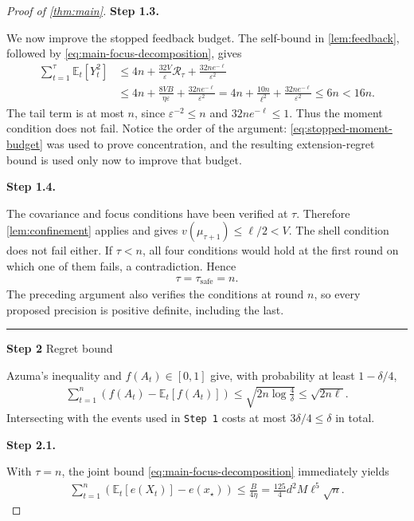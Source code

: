 \documentclass[11pt]{article}
\newcommand{\proofstep}[2]{%
    \par\medskip
    \noindent
    \textcolor{blue!55!black}{\rule{2pt}{1.2em}}%
    \hspace{0.6em}%
    {\sffamily\bfseries\color{blue!55!black}Step #1}%
    \quad
    {\sffamily #2}%
    \par\smallskip
}
\newcommand{\proofstepinline}[1]{%
    {\sffamily\bfseries\color{blue!55!black}Step #1.}\enspace
}
\newcommand{\E}{\mathbb E}
\newcommand{\1}{\mathbf 1}
\newcommand{\eps}{\varepsilon}
\begin{document}
\begin{proof}[Proof of \cref{thm:main}]
    \proofstepinline{1.3}
    We now improve the stopped feedback budget. The self-bound in
    \cref{lem:feedback}, followed by \eqref{eq:main-focus-decomposition},
    gives
    \begin{align}
        \sum_{t=1}^\tau\E_t[Y_t^2]
         & \leq4n+\frac{32V}{\eps}\mathcal R_\tau
        +\frac{32ne^{-\ell}}{\eps^2}
        \\
         & \leq4n+\frac{8VB}{\eta\eps}
        +\frac{32ne^{-\ell}}{\eps^2}
        =4n+\frac{10n}{\ell^2}
        +\frac{32ne^{-\ell}}{\eps^2}
        \leq6n<16n.
        \label{eq:predictable-Y2}
    \end{align}
    The tail term is at most $n$, since $\eps^{-2}\leq n$ and
    $32ne^{-\ell}\leq1$. Thus the moment condition does not fail.
    Notice the order of the argument: \eqref{eq:stopped-moment-budget}
    was used to prove concentration, and the resulting extension-regret
    bound is used only now to improve that budget.

    \proofstepinline{1.4}
    The covariance and focus conditions have been verified at $\tau$.
    Therefore \cref{lem:confinement} applies and gives
    $v(\mu_{\tau+1})\leq\ell/2<V$. The shell condition does not fail either.
    If $\tau<n$, all four conditions would hold at the first round on
    which one of them fails, a contradiction. Hence
    \begin{align}
        \tau=\tau_{\mathrm{safe}}=n.
        \label{eq:main-stability}
    \end{align}
    The preceding argument also verifies the conditions at round $n$,
    so every proposed precision is positive definite, including the last.

    \proofstep{2}{Regret bound}
    Azuma's inequality and $f(A_t)\in[0,1]$ give, with probability at least
    $1-\delta/4$,
    \begin{align}
        \sum_{t=1}^n\left(f(A_t)-\E_t[f(A_t)]\right)
        \leq\sqrt{2n\log\frac4\delta}
        \leq\sqrt{2n\ell}.
        \label{eq:action-martingale}
    \end{align}
    Intersecting with the events used in \texttt{Step 1} costs at most
    $3\delta/4\leq\delta$ in total.

    \proofstepinline{2.1}
    With $\tau=n$, the joint bound \eqref{eq:main-focus-decomposition}
    immediately yields
    \begin{align}
        \sum_{t=1}^n\left(\E_t[e(X_t)]-e(x_\star)\right)
        \leq\frac B{4\eta}
        =\frac{125}{4}d^2M\ell^5\sqrt n.
        \label{eq:main-extension-regret}
    \end{align}


\end{proof}
\end{document}
